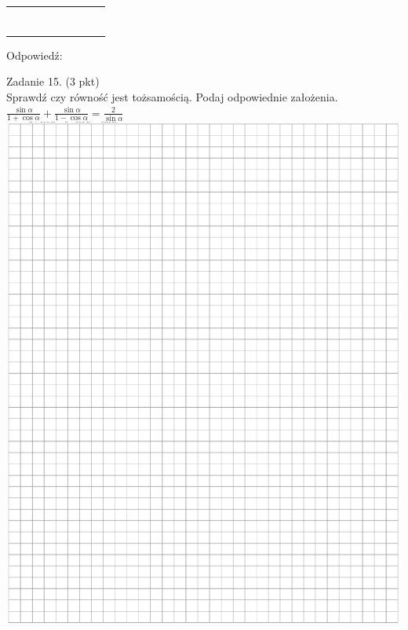 \documentclass[10pt]{article}
\begin{document}
\begin{center}
\begin{tabular}{|l|l|l|l|l|l|l|l|l|}
\hline
 &  &  &  &  &  &  &  &  \\
\hline
 &  &  &  &  &  &  &  &  \\
\hline
 &  &  &  &  &  &  &  &  \\
\hline
 &  &  &  &  &  &  &  &  \\
\hline
 &  &  &  &  &  &  &  &  \\
\hline
 &  &  &  &  &  &  &  &  \\
\hline
 &  &  &  &  &  &  &  &  \\
\hline
 &  &  &  &  &  &  &  &  \\
\hline
\end{tabular}
\end{center}

Odpowiedź:

Zadanie 15. (3 pkt)\\
Sprawdź czy równość jest tożsamością. Podaj odpowiednie założenia.\\
\(\frac{\sin \alpha}{1+\cos \alpha}+\frac{\sin \alpha}{1-\cos \alpha}=\frac{2}{\sin \alpha}\)\\
\includegraphics[max width=\textwidth, center]{2024_11_21_caad0d2d07cc5c30818fg-13}
\end{document}
